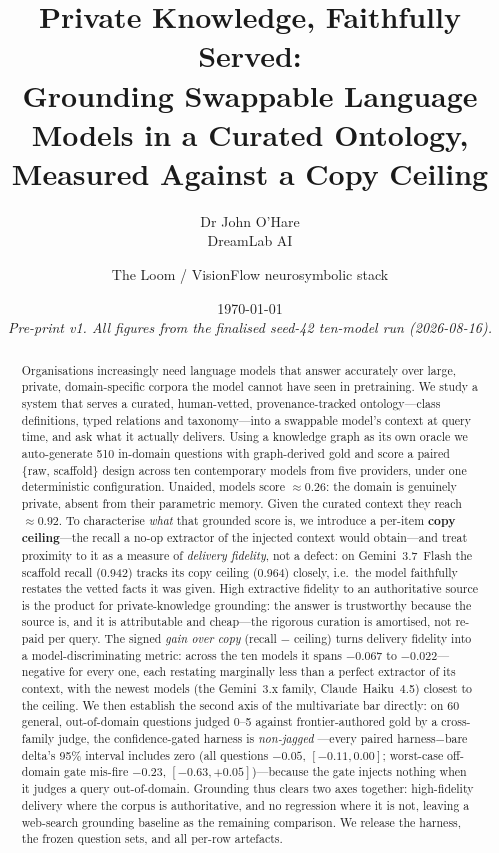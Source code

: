 \documentclass[11pt]{article}
\title{\vspace{-1.2cm}\bfseries Private Knowledge, Faithfully Served:\\[2pt]
Grounding Swappable Language Models in a Curated Ontology,\\ Measured Against a Copy Ceiling}
\author{Dr John O'Hare\\ \small DreamLab AI \and \small The Loom / VisionFlow neurosymbolic stack}
\date{\today\\[4pt]\small\textit{Pre-print v1. All figures from the finalised seed-42 ten-model run (2026-08-16).}}
\begin{document}
\maketitle

\begin{abstract}
\noindent
Organisations increasingly need language models that answer accurately over large, private,
domain-specific corpora the model cannot have seen in pretraining. We study a system that serves
a curated, human-vetted, provenance-tracked ontology---class definitions, typed relations and
taxonomy---into a swappable model's context at query time, and ask what it actually delivers.
Using a knowledge graph as its own oracle we auto-generate 510 in-domain questions with
graph-derived gold and score a paired \{raw, scaffold\} design across ten contemporary models
from five providers, under one deterministic configuration. Unaided, models score $\approx0.26$:
the domain is genuinely private, absent from their parametric memory. Given the curated context
they reach $\approx0.92$. To characterise \emph{what} that grounded score is, we introduce a
per-item \textbf{copy ceiling}---the recall a no-op extractor of the injected context would
obtain---and treat proximity to it as a measure of \emph{delivery fidelity}, not a defect: on
Gemini~3.7~Flash the scaffold recall (0.942) tracks its copy ceiling (0.964) closely, i.e.\ the
model faithfully restates the vetted facts it was given. High extractive fidelity to an
authoritative source is the product for private-knowledge grounding: the answer is trustworthy
because the source is, and it is attributable and cheap---the rigorous curation is amortised, not
re-paid per query. The signed \emph{gain over copy} (recall $-$ ceiling) turns delivery fidelity
into a model-discriminating metric:
across the ten models it spans $-0.067$ to $-0.022$---negative for every one, each restating
marginally less than a perfect extractor of its context, with the newest models (the Gemini~3.x
family, Claude~Haiku~4.5) closest to the ceiling. We then establish the second axis of the
multivariate bar directly: on 60 general, out-of-domain questions judged 0--5 against
frontier-authored gold by a cross-family judge, the confidence-gated harness is \emph{non-jagged}
---every paired harness$-$bare delta's 95\% interval includes zero (all questions $-0.05$,
$[-0.11,0.00]$; worst-case off-domain gate mis-fire $-0.23$, $[-0.63,+0.05]$)---because the gate
injects nothing when it judges a query out-of-domain. Grounding thus clears two axes together:
high-fidelity delivery where the corpus is authoritative, and no regression where it is not, leaving
a web-search grounding baseline as the remaining comparison. We release the harness, the frozen
question sets, and all per-row artefacts.
\end{abstract}
\end{document}
